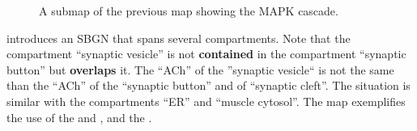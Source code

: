 \begin{figure}[b]
\begin{center}
\caption{A submap of the previous map showing the MAPK cascade.}\label{fig:mapk}
\end{center}
\end{figure}

 introduces an SBGN \PD that spans several compartments. Note that the compartment ``synaptic vesicle'' is not \textbf{contained} in the compartment ``synaptic button'' but \textbf{overlaps} it. The  ``ACh'' of the ''synaptic vesicle`` is not the same  than the ``ACh'' of the ``synaptic button'' and of ``synaptic cleft''.  The situation is similar with the compartments ``ER'' and ``muscle cytosol''.  The map exemplifies the use of the   and , and the  .

